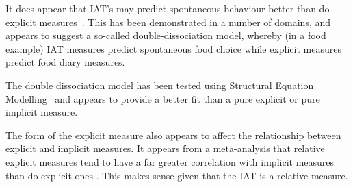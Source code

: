
It does appear that IAT's may predict spontaneous behaviour better than do explicit measures~\cite{Asendorpf2002,Richetin2007,Perugini2005}. This has been demonstrated in a number of domains, and appears to suggest a so-called double-dissociation model, whereby (in a food example) IAT measures predict spontaneous food choice while explicit measures predict food diary measures. 

The double dissociation model has been tested using Structural Equation Modelling~\cite{Nosek2007a,Perugini2005} and appears to provide a better fit than a pure explicit or pure implicit measure. %

The form of the explicit measure also appears to affect the relationship between explicit and implicit measures. It appears from a meta-analysis that relative explicit measures tend to have a far greater correlation with implicit measures than do explicit ones \cite{Hofmann2005}. This makes sense given that the IAT is a relative measure. 






